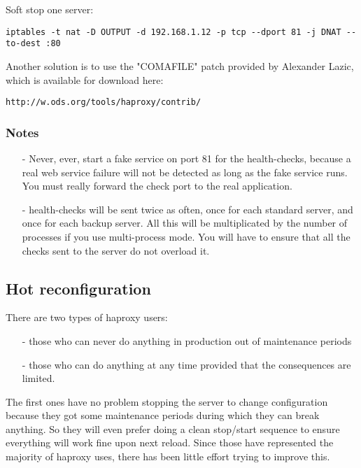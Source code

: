 Soft stop one server:
\begin{verbatim}
iptables -t nat -D OUTPUT -d 192.168.1.12 -p tcp --dport 81 -j DNAT --to-dest :80
\end{verbatim}

Another solution is to use the "COMAFILE" patch provided by Alexander Lazic,
which is available for download here:

   \verb|http://w.ods.org/tools/haproxy/contrib/|


\subsubsection{Notes}

\begin{itemize}
\item[-] Never, ever, start a fake service on port 81 for the health-checks, because
    a real web service failure will not be detected as long as the fake service
    runs. You must really forward the check port to the real application.

\item[-] health-checks will be sent twice as often, once for each standard server,
    and once for each backup server. All this will be multiplicated by the
    number of processes if you use multi-process mode. You will have to ensure
    that all the checks sent to the server do not overload it.
\end{itemize}

\subsection{Hot reconfiguration}

There are two types of haproxy users:
\begin{itemize}
\item[-] those who can never do anything in production out of maintenance periods
\item[-] those who can do anything at any time provided that the consequences are limited.
\end{itemize}

The first ones have no problem stopping the server to change configuration
because they got some maintenance periods during which they can break anything.
So they will even prefer doing a clean stop/start sequence to ensure everything
will work fine upon next reload. Since those have represented the majority of
haproxy uses, there has been little effort trying to improve this.

